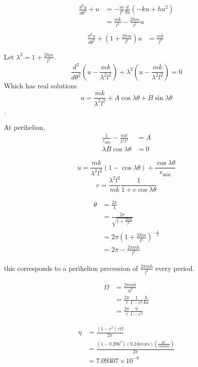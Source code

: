 \documentclass{article}
\begin{document}
\begin{align*}
    \frac{d^{2} u}{d \theta^{2}}+u&=-\frac{m}{l^{2}} \frac{d}{d u}\left(-k u+h u^{2}\right)\\
    &=\frac{m k}{l^{2}}-\frac{2 h m}{l^{2}} u\\
\end{align*}
\begin{align*}
    \frac{d^{2} u}{d \theta^{2}}+(1+\frac{2 h m}{l^{2}}) u&=\frac{m k}{l^{2}}\
\end{align*}

Let $\lambda^2  = 1+\frac{2 h m}{l^{2}}$.
$$
    \frac{d^{2}}{d \theta^{2}}\left(u-\frac{m k}{\lambda^{2} l^{2}}\right)+\lambda^{2}\left(u-\frac{m k}{\lambda^{2} l^{2}}\right)=0
$$
Which has real solutions 
$$ u = \frac{m k}{\lambda^{2} l^{2}} + A \cos \lambda\theta + B \sin \lambda \theta$$.


At perihelion, 
\begin{align*}
    \frac{1}{r_{\min }}-\frac{m k}{\lambda^{2} l^{2}}&=A\\
    \lambda B \cos \lambda \theta &=0
\end{align*}

$$
    u = \frac{m k}{\lambda^{2} l^{2}} ( 1 - \cos \lambda \theta) + \frac{\cos \lambda \theta}{r_\mathrm{min}}
$$
$$
r=\frac{\lambda^{2} l^{2}}{m k} \frac{1}{1+e \cos \lambda \theta}
$$

\begin{align*}
    \theta&=\frac{2 \pi}{\lambda}\\
    &=\frac{2 \pi}{\sqrt{1+\frac{2 h m}{l^{2}}}}\\
    &=2 \pi\left(1+\frac{2 h m}{l^{2}}\right)^{-\frac{1}{2}}\\
    &=2 \pi-\frac{2 \pi m h}{l^{2}}
\end{align*}

this corresponds to a perihelion precession of $\frac{2 \pi m h}{l^{2}}$ every period. 

\begin{align*}
    \dot\Omega &= \frac{2 \pi m h}{\tau l^{2}}\\
    &=\frac{2 \pi}{\tau} \frac{1}{1-e^{2}} \frac{h}{k a}\\
    &=\frac{2 \pi}{\tau} \frac{\eta}{1-e^{2}} 
\end{align*}

\begin{align*}
    \eta &= \frac{\left(1-e^{2}\right) \tau \dot{\Omega}}{2 \pi}\\
    &= \frac{\left(1-0.206^{2}\right) (0.24 \mathrm{years}) (\frac{40^{\prime\prime}}{\mathrm{century}})}{2 \pi}\\
    &= 7.09307 \times 10^{-8}
\end{align*}
\end{document}
